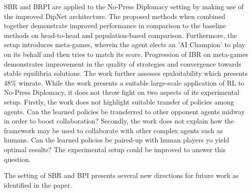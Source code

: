 \documentclass[11pt,letterpaper]{article}
\begin{document}
SBR and BRPI are applied to the No-Press Diplomacy setting by making use of the improved DipNet architecture. The proposed methods when combined together demonstrate improved performance in comparison to the baseline methods on head-to-head and population-based comparison. Furthermore, the setup introduces meta-games, wherein the agent elects an 'AI Champion' to play on its behalf and then tries to match its score. Progression of IBR on meta-games demonstrates improvement in the quality of strategies and convergence towards stable equilibria solutions. The work further assesses epxloitability which presents 48\% winrate. While the work presents a suitable large-scale application of RL to No-Press Diplomacy, it does not throw light on two aspects of its experimental setup. Firstly, the work does not highlight suitable transfer of policies among agents. Can the learned policies be transferred to other opponent agents midway in order to boost collaboration? Secondly, the work does not explain how the framework may be used to collaborate with other complex agents such as humans. Can the learned policies be paired-up with human players yo yield optimal results? The experimental setup could be improved to answer this question.

The setting of SBR and BPI presents several new directions for future work as identified in the paper. 
\end{document}
